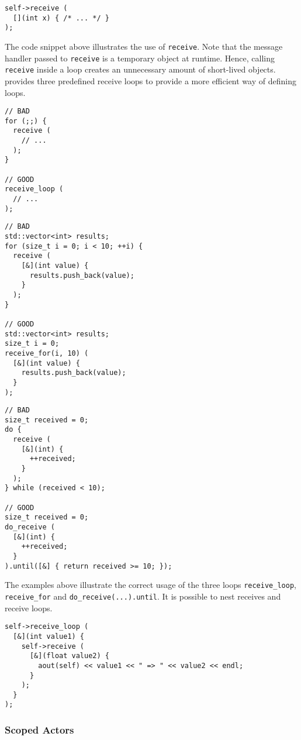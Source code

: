 \begin{lstlisting}
self->receive (
  [](int x) { /* ... */ }
);
\end{lstlisting}

The code snippet above illustrates the use of \lstinline^receive^.
Note that the message handler passed to \lstinline^receive^ is a temporary object at runtime.
Hence, calling \lstinline^receive^ inside a loop creates an unnecessary amount of short-lived objects.
\lib provides three predefined receive loops to provide a more efficient way of defining loops.

\begin{lstlisting}
// BAD
for (;;) {
  receive (
    // ...
  );
}

// GOOD
receive_loop (
  // ...
);
\end{lstlisting}

\begin{lstlisting}
// BAD
std::vector<int> results;
for (size_t i = 0; i < 10; ++i) {
  receive (
    [&](int value) {
      results.push_back(value);
    }
  );
}

// GOOD
std::vector<int> results;
size_t i = 0;
receive_for(i, 10) (
  [&](int value) {
    results.push_back(value);
  }
);
\end{lstlisting}

\clearpage
\begin{lstlisting}
// BAD
size_t received = 0;
do {
  receive (
    [&](int) {
      ++received;
    }
  );
} while (received < 10);

// GOOD
size_t received = 0;
do_receive (
  [&](int) {
    ++received;
  }
).until([&] { return received >= 10; });
\end{lstlisting}

The examples above illustrate the correct usage of the three loops \lstinline^receive_loop^, \lstinline^receive_for^ and \lstinline^do_receive(...).until^.
It is possible to nest receives and receive loops.

\begin{lstlisting}
self->receive_loop (
  [&](int value1) {
    self->receive (
      [&](float value2) {
        aout(self) << value1 << " => " << value2 << endl;
      }
    );
  }
);
\end{lstlisting}

\subsubsection{Scoped Actors}
\label{scoped-actors}

